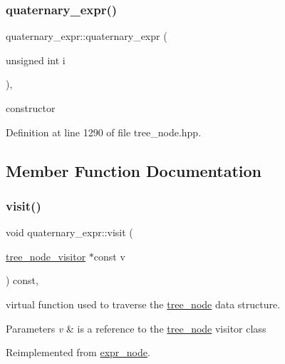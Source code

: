 \subsubsection{\texorpdfstring{quaternary\+\_\+expr()}{quaternary\_expr()}}
{\footnotesize\ttfamily quaternary\+\_\+expr\+::quaternary\+\_\+expr (\begin{DoxyParamCaption}\item[{unsigned int}]{i }\end{DoxyParamCaption})\hspace{0.3cm}{\ttfamily [inline]}, {\ttfamily [explicit]}}



constructor 



Definition at line 1290 of file tree\+\_\+node.\+hpp.



\subsection{Member Function Documentation}
\mbox{\label{structquaternary__expr_ad01a5f8cb89a8bc218aa66029faf2cde}} 
\subsubsection{\texorpdfstring{visit()}{visit()}}
{\footnotesize\ttfamily void quaternary\+\_\+expr\+::visit (\begin{DoxyParamCaption}\item[{\hyperlink{classtree__node__visitor}{tree\+\_\+node\+\_\+visitor} $\ast$const}]{v }\end{DoxyParamCaption}) const\hspace{0.3cm}{\ttfamily [override]}, {\ttfamily [virtual]}}



virtual function used to traverse the \hyperlink{classtree__node}{tree\+\_\+node} data structure. 


\begin{DoxyParams}{Parameters}
{\em v} & is a reference to the \hyperlink{classtree__node}{tree\+\_\+node} visitor class \\
\hline
\end{DoxyParams}


Reimplemented from \hyperlink{structexpr__node_aac767878f13ca07371dde2c3938ef38a}{expr\+\_\+node}.




